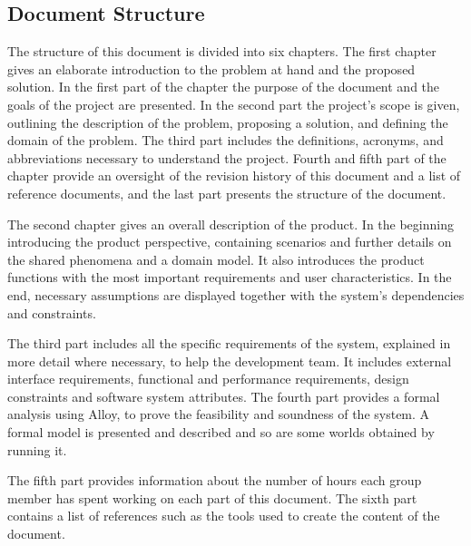 \subsection{Document Structure}
\hspace{\parindent}The structure of this document is divided into six chapters. 
The first chapter gives an elaborate introduction to the problem at hand and the proposed solution. In the first part of the chapter the purpose of the document and the goals of the project are presented. In the second part the project's scope is given, outlining the description of the problem, proposing a solution, and defining the domain of the problem. The third part includes the definitions, acronyms, and abbreviations necessary to understand the project. Fourth and fifth part of the chapter provide an oversight of the revision history of this document and a list of reference documents, and the last part presents the structure of the document.
 
The second chapter gives an overall description of the product. In the beginning introducing the product perspective, containing scenarios and further details on the shared phenomena and a domain model. It also introduces the product functions with the most important requirements and user characteristics. In the end, necessary assumptions are displayed together with the system's dependencies and constraints.

The third part includes all the specific requirements of the system, explained in more detail where necessary, to help the development team. It includes external interface requirements, functional and performance requirements, design constraints and software system attributes. 
The fourth part provides a formal analysis using Alloy, to prove the feasibility and soundness of the system. A formal model is presented and described and so are some worlds obtained by running it. 

The fifth part provides information about the number of hours each group member has spent working on each part of this document. 
The sixth part contains a list of references such as the tools used to create the content of the document. 

